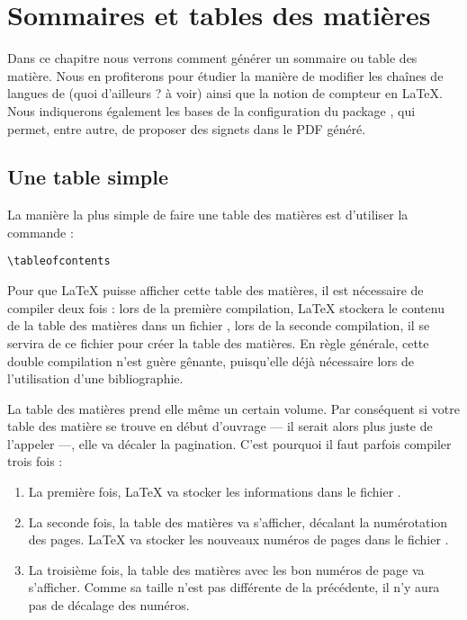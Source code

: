 \chapter{Sommaires et tables des matières}\label{toc}

\begin{prealable}
Dans ce chapitre nous verrons comment générer un sommaire ou table des matière. Nous en profiterons pour étudier la manière de modifier les chaînes de langues de (quoi d'ailleurs ? à voir) ainsi que la notion de compteur en \LaTeX{}. Nous indiquerons également les bases de la configuration du package , qui permet, entre autre, de proposer des signets dans le PDF généré.
\end{prealable}

\section{Une table simple}

La manière la plus simple de faire une table des matières est d'utiliser la commande :

\begin{verbatim}
\tableofcontents
\end{verbatim}

Pour que \LaTeX{} puisse afficher cette table des matières, il est nécessaire de compiler deux fois : lors de la première compilation, \LaTeX{} stockera le contenu de la table des matières dans un fichier , lors de la seconde compilation, il se servira de ce fichier pour créer la table des matières. En règle générale, cette double compilation n'est guère gênante, puisqu'elle déjà nécessaire lors de l'utilisation d'une bibliographie.

\begin{attention}
La table des matières prend elle même un certain volume. Par conséquent si votre table des matière se trouve en début d'ouvrage --- il serait alors plus juste de l'appeler  ---, elle va décaler la pagination. C'est pourquoi il faut parfois compiler trois fois :

\begin{enumerate}
\item La première fois, \LaTeX{} va stocker les informations dans le fichier .
\item La seconde fois, la table des matières va s'afficher, décalant la numérotation des pages. \LaTeX{} va stocker les nouveaux numéros de pages  dans le fichier .
\item La troisième fois, la table des matières avec les bon numéros de page  va s'afficher. Comme sa taille n'est pas différente de la précédente, il n'y aura pas de décalage des numéros.
\end{enumerate}

\end{attention}

